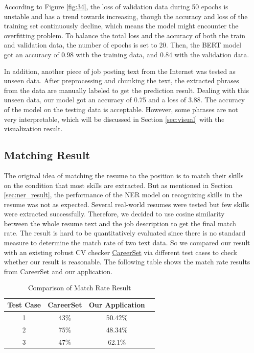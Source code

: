According to Figure \ref{fig:34}, the loss of validation data during 50 epochs is unstable and has a trend towards increasing, though the accuracy and loss of the training set continuously decline, which means the model might encounter the overfitting problem. To balance the total loss and the accuracy of both the train and validation data, the number of epochs is set to 20. Then, the BERT model got an accuracy of 0.98 with the training data, and 0.84 with the validation data.

In addition, another piece of job posting text from the Internet was tested as unseen data. After preprocessing and chunking the text, the extracted phrases from the data are manually labeled to get the prediction result. Dealing with this unseen data, our model got an accuracy of 0.75 and a loss of 3.88. The accuracy of the model on the testing data is acceptable. However, some phrases are not very interpretable, which will be discussed in Section \ref{sec:visual} with the visualization result. 




\subsection{Matching Result}

The original idea of matching the resume to the position is to match their skills on the condition that most skills are extracted. But as mentioned in Section \ref{sec:ner_result}, the performance of the NER model on recognizing skills in the resume was not as expected. Several real-world resumes were tested but few skills were extracted successfully. Therefore, we decided to use cosine similarity between the whole resume text and the job description to get the final match rate. The result is hard to be quantitatively evaluated since there is no standard measure to determine the match rate of two text data. So we compared our result with an existing robust CV checker \href{https://careerset.com/}{CareerSet} via different test cases to check whether our result is reasonable. The following table shows the match rate results from CareerSet and our application.

\begin{table}[htbp]
\centering
\begin{tabular}{|c|c|c|c|}
\hline
Test Case & CareerSet & Our Application\\
\hline
1 & 43\% & 50.42\%\\
\hline
2 & 75\% & 48.34\%\\
\hline
3 & 47\% & 62.1\% \\
\hline
\end{tabular}
\caption{Comparison of Match Rate Result}
\label{tbl:5}
\end{table}

